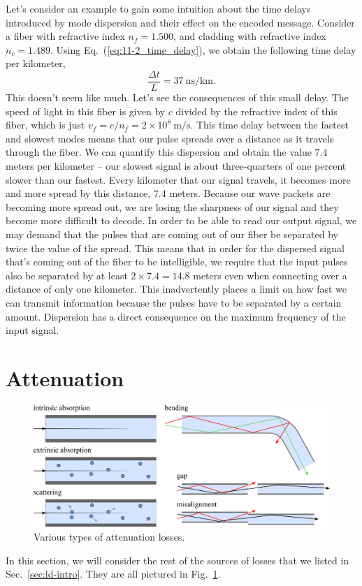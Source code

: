 Let's consider an example to gain some intuition about the time delays introduced by mode dispersion and their effect on the encoded message.
Consider a fiber with refractive index $n_f = 1.500$, and cladding with refractive index $n_c = 1.489$.
Using Eq.~(\ref{eq:11-2_time_delay}), we obtain the following time delay per kilometer,
\begin{equation}
    \frac{\Delta t}{L}=37 \mathrm{~ns} / \mathrm{km}.
\end{equation}
This doesn't seem like much.
Let's see the consequences of this small delay.
The speed of light in this fiber is given by $c$ divided by the refractive index of this fiber, which is just $v_f=c / n_f=2 \times 10^8 \mathrm{~m} / \mathrm{s}$.
This time delay between the fastest and slowest modes means that our pulse spreads over a distance as it travels through the fiber. We can quantify this dispersion and obtain the value $7.4$ meters per kilometer -- our slowest signal is about three-quarters of one percent slower than our fastest. Every kilometer that our signal travels, it becomes more and more spread by this distance, $7.4$ meters.
Because our wave packets are becoming more spread out, we are losing the sharpness of our signal and they become more difficult to decode. In order to be able to read our output signal, we may demand that the pulses that are coming out of our fiber be separated by twice the value of the spread.
This means that in order for the dispersed signal that's coming out of the fiber to be intelligible, we require that the input pulses also be separated by at least $2\times 7.4 = 14.8$ meters even when connecting over a distance of only one kilometer. This inadvertently places a limit on how fast we can transmit information because the pulses have to be separated by a certain amount.
Dispersion has a direct consequence on the maximum frequency of the input signal.



\section{Attenuation}
\label{sec:11-3_attenuation}

\begin{figure}[t]
    \centering
    \includegraphics[width=\textwidth]{lesson11/11-3_attenuation.pdf}
    \caption[Attenuation losses]{Various types of attenuation losses.}
    \label{fig:11-3_attenuation}
\end{figure}
In this section, we will consider the rest of the sources of losses that we listed in Sec.~\ref{sec:ld-intro}.
They are all pictured in Fig.~\ref{fig:11-3_attenuation}.


